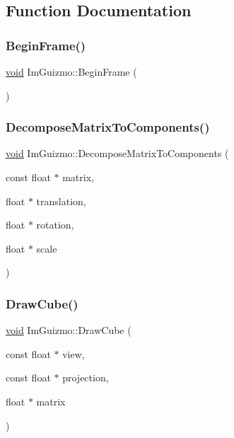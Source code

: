 \subsection{Function Documentation}
\mbox{\label{namespace_im_guizmo_a2dfada1eb84fda54a892be444caf0588}} 
\subsubsection{\texorpdfstring{Begin\+Frame()}{BeginFrame()}}
{\footnotesize\ttfamily \mbox{\hyperlink{_thread_8h_af1e856da2e658414cb2456cb6f7ebc66}{void}} Im\+Guizmo\+::\+Begin\+Frame (\begin{DoxyParamCaption}{ }\end{DoxyParamCaption})}

\mbox{\label{namespace_im_guizmo_a8cc3ef9e0b149b8276fe69817360ee25}} 
\subsubsection{\texorpdfstring{Decompose\+Matrix\+To\+Components()}{DecomposeMatrixToComponents()}}
{\footnotesize\ttfamily \mbox{\hyperlink{_thread_8h_af1e856da2e658414cb2456cb6f7ebc66}{void}} Im\+Guizmo\+::\+Decompose\+Matrix\+To\+Components (\begin{DoxyParamCaption}\item[{const float $\ast$}]{matrix,  }\item[{float $\ast$}]{translation,  }\item[{float $\ast$}]{rotation,  }\item[{float $\ast$}]{scale }\end{DoxyParamCaption})}

\mbox{\label{namespace_im_guizmo_acc60c99158253466671e9aac426f52f2}} 
\subsubsection{\texorpdfstring{Draw\+Cube()}{DrawCube()}}
{\footnotesize\ttfamily \mbox{\hyperlink{_thread_8h_af1e856da2e658414cb2456cb6f7ebc66}{void}} Im\+Guizmo\+::\+Draw\+Cube (\begin{DoxyParamCaption}\item[{const float $\ast$}]{view,  }\item[{const float $\ast$}]{projection,  }\item[{float $\ast$}]{matrix }\end{DoxyParamCaption})}

